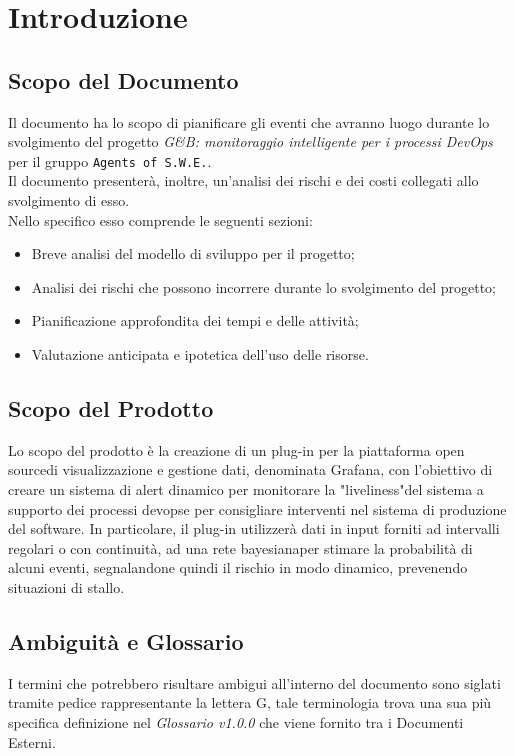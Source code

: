 \section{Introduzione
\label{Introduzione}}

\subsection{Scopo del Documento}
Il documento ha lo scopo di pianificare gli eventi che avranno luogo durante lo svolgimento del progetto \textit{G\&B: monitoraggio intelligente per i processi DevOps\glossario} per il gruppo \texttt{Agents of S.W.E.}.\\
Il documento presenterà, inoltre, un'analisi dei rischi e dei costi collegati allo svolgimento di esso. \\
Nello specifico esso comprende le seguenti sezioni:
\begin{itemize}
\item Breve analisi del modello di sviluppo per il progetto;
\item Analisi dei rischi che possono incorrere durante lo svolgimento del progetto;
\item Pianificazione approfondita dei tempi e delle attività;
\item Valutazione anticipata e ipotetica dell'uso delle risorse.
\end{itemize}
 
\subsection{Scopo del Prodotto} 
Lo scopo del prodotto è la creazione di un plug-in per la piattaforma open source\glossario di visualizzazione e gestione dati, denominata Grafana, 
con l'obiettivo di creare un sistema di alert dinamico per monitorare la "liveliness"\glossario del sistema a supporto dei processi
devops\glossario e per consigliare interventi nel sistema di produzione del software.
In particolare, il plug-in utilizzerà dati in input forniti ad intervalli regolari o con continuità, ad una rete bayesiana\glossario per stimare la probabilità di alcuni eventi, segnalandone quindi il rischio in modo dinamico, prevenendo situazioni di stallo.   

 
\subsection{Ambiguità e Glossario}
I termini che potrebbero risultare ambigui all'interno del documento sono siglati tramite pedice rappresentante la lettera \textmd{G}, tale terminologia trova una sua più specifica definizione nel \textit{Glossario v1.0.0} che viene fornito tra i Documenti Esterni.



